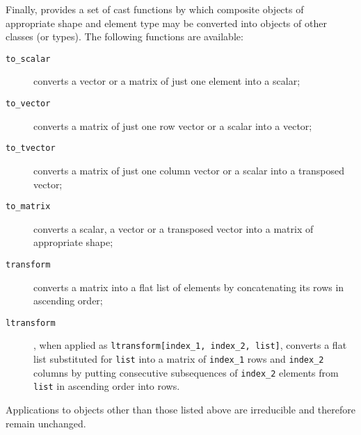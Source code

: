 Finally, \kir provides a set of {\mys cast functions} by which
composite objects of appropriate shape and element type may be
 converted into objects of other classes (or types). The following
functions are available:
\begin{description}
\item[{\tt to\_scalar}] converts a vector or a matrix of just one
element into a scalar;
\item[{\tt to\_vector}] converts a matrix of just one row vector 
or a scalar into a vector;
\item[{\tt to\_tvector}] converts a matrix of just one column vector or a scalar into a transposed vector;
\item[{\tt to\_matrix}] converts a scalar, a vector or a transposed vector into a matrix of appropriate shape;
\item[{\tt transform}] converts a matrix into a flat list of
elements by concatenating its rows in ascending order;
\item[{\tt ltransform}], when applied as {\tt ltransform[index\_1, index\_2, list]}, converts a flat list substituted for {\tt list} into
a matrix of {\tt index\_1} rows and {\tt index\_2} columns by
 putting
consecutive subsequences of {\tt index\_2} elements from {\tt list} in ascending order into rows.
\end{description}
Applications to objects other than those listed above are irreducible and therefore remain unchanged.

